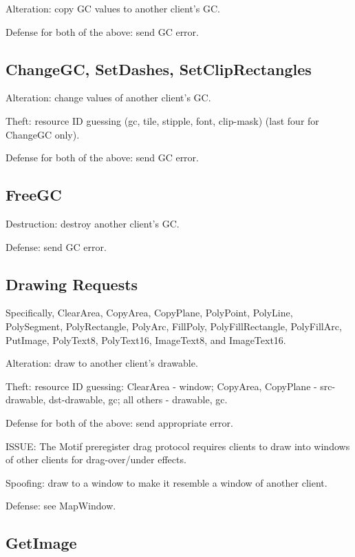 Alteration: copy GC values to another client's GC.

Defense for both of the above: send GC error.



\subsection{ChangeGC, SetDashes, SetClipRectangles}

Alteration: change values of another client's GC.

Theft: resource ID guessing (gc, tile, stipple, font, clip-mask)
(last four for ChangeGC only).

Defense for both of the above: send GC error.



\subsection{FreeGC}

Destruction: destroy another client's GC.

Defense: send GC error.



\subsection{Drawing Requests}

Specifically, ClearArea, CopyArea, CopyPlane, PolyPoint,
PolyLine, PolySegment, PolyRectangle, PolyArc, FillPoly,
PolyFillRectangle, PolyFillArc, PutImage, PolyText8, PolyText16,
ImageText8, and ImageText16.

Alteration: draw to another client's drawable.

Theft: resource ID guessing:
	ClearArea - window;
	CopyArea, CopyPlane - src-drawable, dst-drawable, gc;
	all others - drawable, gc.

Defense for both of the above: send appropriate error.

ISSUE: The Motif preregister drag protocol requires clients to draw
into windows of other clients for drag-over/under effects.

Spoofing: draw to a window to make it resemble a window of
another client.

Defense: see MapWindow.



\subsection{GetImage}

